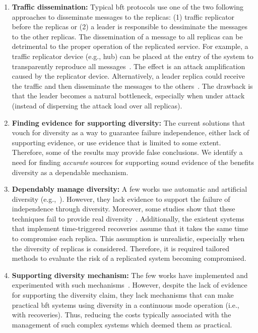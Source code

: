 \begin{enumerate}

\item \textbf{Traffic dissemination:} 
Typical \gls{bft} protocols use one of the two following approaches to disseminate messages to the replicas: (1) traffic replicator before the replicas or (2) a leader is responsible to dessiminate the messages to the other replicas. 
The dissemination of a message to all replicas can be detrimental to the proper operation of the replicated service.
For example, a traffic replicator device (e.g., hub) can be placed at the entry of the system to transparently reproduce all messages~\cite{Sousa:2010,Roeder:2010}. 
The effect is an attack amplification caused by the replicator device.
Alternatively, a leader replica could receive the traffic and then disseminate the messages to the others~\cite{Amir:2011}.
The drawback is that the leader becomes a natural bottleneck, especially when under attack (instead of dispersing the attack load over all replicas).

\item \textbf{Finding evidence for supporting diversity:} 
The current solutions that vouch for diversity as a way to guarantee failure independence, either lack of supporting evidence, or use evidence that is limited to some extent.
Therefore, some of the results may provide false conclusions.
We identify a need for finding \emph{accurate} sources for supporting sound evidence of the benefits diversity as a dependable mechanism.

\item \textbf{Dependably manage diversity:} 
A few works use automatic and artificial diversity (e.g.,~\cite{Roeder:2010,Amir:2011}). 
However, they lack evidence to support the failure of independence through diversity. 
Moreover, some studies show that these techniques fail to provide real diversity~\cite{Snow:2013,Bittau:2014}. 
Additionally, the existent systems that implement time-triggered recoveries assume that it takes the same time to compromise each replica. 
This assumption is unrealistic, especially when the diversity of replicas is considered. 
Therefore, it is required tailored methods to evaluate the risk of a replicated system becoming compromised.


\item \textbf{Supporting diversity mechanism:}
The few works have implemented and experimented with such mechanisms~\cite{Rodrigues:2001,Roeder:2010,Amir:2011}. 
However, despite the lack of evidence for supporting the diversity claim, they lack mechanisms that can make practical \gls{bft} systems using diversity in a continuous mode operation (i.e., with recoveries).  
Thus, reducing the costs typically associated with the management of such complex systems which deemed them as practical.



\end{enumerate}
